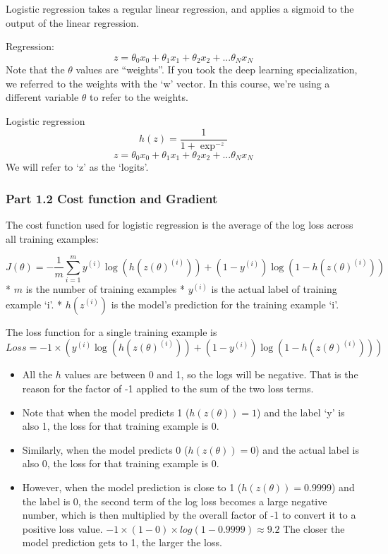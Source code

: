 \documentclass[11pt]{article}
\providecommand{\tightlist}{%
      \setlength{\itemsep}{0pt}\setlength{\parskip}{0pt}}
\begin{document}
Logistic regression takes a regular linear regression, and applies a
sigmoid to the output of the linear regression.

Regression:
\[z = \theta_0 x_0 + \theta_1 x_1 + \theta_2 x_2 + ... \theta_N x_N\]
Note that the \(\theta\) values are ``weights''. If you took the deep
learning specialization, we referred to the weights with the `w' vector.
In this course, we're using a different variable \(\theta\) to refer to
the weights.

Logistic regression \[ h(z) = \frac{1}{1+\exp^{-z}}\]
\[z = \theta_0 x_0 + \theta_1 x_1 + \theta_2 x_2 + ... \theta_N x_N\] We
will refer to `z' as the `logits'.

    \hypertarget{part-1.2-cost-function-and-gradient}{%
\subsubsection{Part 1.2 Cost function and
Gradient}\label{part-1.2-cost-function-and-gradient}}

The cost function used for logistic regression is the average of the log
loss across all training examples:

\[J(\theta) = -\frac{1}{m} \sum_{i=1}^m y^{(i)}\log (h(z(\theta)^{(i)})) + (1-y^{(i)})\log (1-h(z(\theta)^{(i)}))\tag{5} \]
* \(m\) is the number of training examples * \(y^{(i)}\) is the actual
label of training example `i'. * \(h(z^{(i)})\) is the model's
prediction for the training example `i'.

The loss function for a single training example is
\[ Loss = -1 \times \left( y^{(i)}\log (h(z(\theta)^{(i)})) + (1-y^{(i)})\log (1-h(z(\theta)^{(i)})) \right)\]

\begin{itemize}
\tightlist
\item
  All the \(h\) values are between 0 and 1, so the logs will be
  negative. That is the reason for the factor of -1 applied to the sum
  of the two loss terms.
\item
  Note that when the model predicts 1 (\(h(z(\theta)) = 1\)) and the
  label `y' is also 1, the loss for that training example is 0.
\item
  Similarly, when the model predicts 0 (\(h(z(\theta)) = 0\)) and the
  actual label is also 0, the loss for that training example is 0.
\item
  However, when the model prediction is close to 1
  (\(h(z(\theta)) = 0.9999\)) and the label is 0, the second term of the
  log loss becomes a large negative number, which is then multiplied by
  the overall factor of -1 to convert it to a positive loss value.
  \(-1 \times (1 - 0) \times log(1 - 0.9999) \approx 9.2\) The closer
  the model prediction gets to 1, the larger the loss.
\end{itemize}
\end{document}
